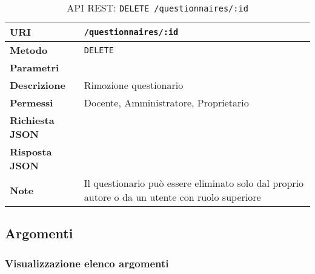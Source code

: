         \begin{table}[H]
            \begin{center}
                \begin{tabular}{p{} p{}}
                    \toprule
                    \textbf{URI} & \texttt{/questionnaires/:id} \\ \midrule
                    \textbf{Metodo} & \texttt{DELETE} \\ \midrule
                    \textbf{Parametri} & \\ \midrule
                    \textbf{Descrizione} & Rimozione questionario \\ \midrule
                    \textbf{Permessi} & Docente, Amministratore, Proprietario  \\ \midrule
                    \textbf{Richiesta JSON} & \\ \midrule
                    \textbf{Risposta JSON} & \\ \midrule
                    \textbf{Note} & Il questionario può essere eliminato solo dal proprio autore
                        o da un utente con ruolo superiore \\
                    \bottomrule
                \end{tabular}
                \caption{API REST: \texttt{DELETE /questionnaires/:id}}
            \end{center}
        \end{table}

\subsection{Argomenti}

    \subsubsection{Visualizzazione elenco argomenti}

